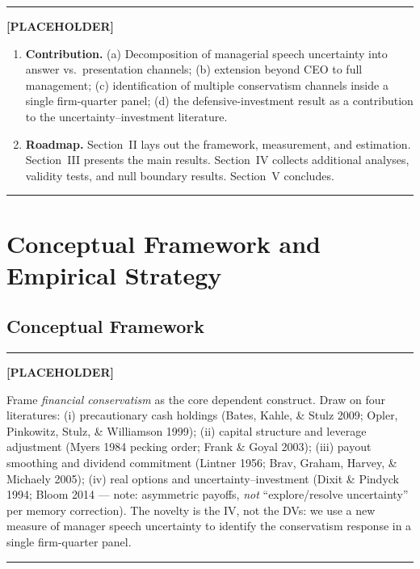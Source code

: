 \documentclass[11pt,a4paper,twocolumn]{article}
\newenvironment{placeholder}{%
  \par\medskip\noindent%
  {\color{placeholderaccent}\rule{\linewidth}{0.4pt}}\par%
  \noindent\textbf{\color{placeholderaccent}[PLACEHOLDER]}\par%
  \smallskip\itshape%
}{%
  \par\upshape\smallskip%
  {\color{placeholderaccent}\rule{\linewidth}{0.4pt}}\par\medskip%
}
\begin{document}
\begin{placeholder}
\begin{enumerate}
        (Hoberg-Phillips TSIMM).
  \item \textbf{Contribution.} (a) Decomposition of managerial
        speech uncertainty into answer vs.\ presentation channels;
        (b) extension beyond CEO to full management; (c) identification
        of multiple conservatism channels inside a single firm-quarter
        panel; (d) the defensive-investment result as a contribution to
        the uncertainty--investment literature.
  \item \textbf{Roadmap.} Section~II lays out the framework, measurement,
        and estimation. Section~III presents the main results.
        Section~IV collects additional analyses, validity tests, and
        null boundary results. Section~V concludes.
\end{enumerate}
\end{placeholder}

\clearpage

\section{Conceptual Framework and Empirical Strategy}
\label{sec:framework}

\subsection{Conceptual Framework}
\label{sec:framework_concept}
\begin{placeholder}
Frame \emph{financial conservatism} as the core dependent construct.
Draw on four literatures:
(i) precautionary cash holdings (Bates, Kahle, \& Stulz 2009;
Opler, Pinkowitz, Stulz, \& Williamson 1999);
(ii) capital structure and leverage adjustment (Myers 1984 pecking order;
Frank \& Goyal 2003);
(iii) payout smoothing and dividend commitment
(Lintner 1956; Brav, Graham, Harvey, \& Michaely 2005);
(iv) real options and uncertainty--investment
(Dixit \& Pindyck 1994; Bloom 2014 --- note: asymmetric payoffs,
\emph{not} ``explore/resolve uncertainty'' per memory correction).
The novelty is the IV, not the DVs: we use a new measure of manager
speech uncertainty to identify the conservatism response in a single
firm-quarter panel.
\end{placeholder}
\end{document}
